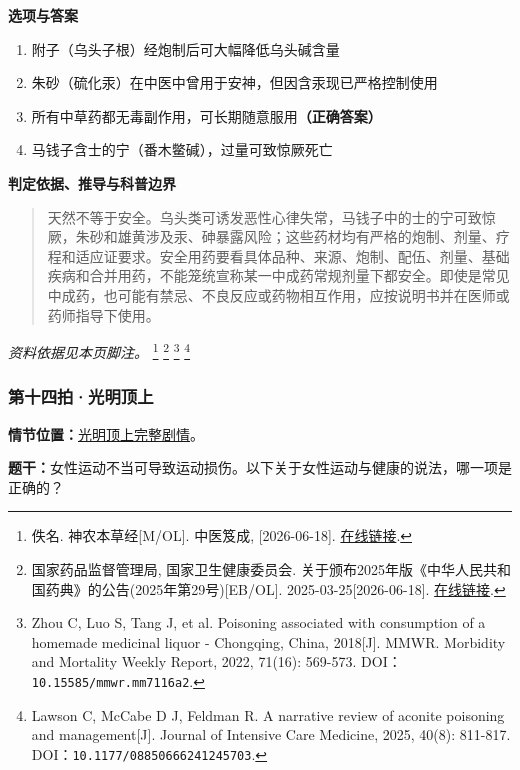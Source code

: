 \textbf{选项与答案}
\begin{enumerate}[label=\Alph*.,leftmargin=*]
  \item 附子（乌头子根）经炮制后可大幅降低乌头碱含量
  \item 朱砂（硫化汞）在中医中曾用于安神，但因含汞现已严格控制使用
  \item 所有中草药都无毒副作用，可长期随意服用\textbf{（正确答案）}
  \item 马钱子含士的宁（番木鳖碱），过量可致惊厥死亡
\end{enumerate}
\textbf{判定依据、推导与科普边界}
\begin{quote}天然不等于安全。乌头类可诱发恶性心律失常，马钱子中的士的宁可致惊厥，朱砂和雄黄涉及汞、砷暴露风险；这些药材均有严格的炮制、剂量、疗程和适应证要求。安全用药要看具体品种、来源、炮制、配伍、剂量、基础疾病和合并用药，不能笼统宣称某一中成药常规剂量下都安全。即使是常见中成药，也可能有禁忌、不良反应或药物相互作用，应按说明书并在医师或药师指导下使用。\end{quote}
\noindent\textit{资料依据见本页脚注。}
\footnote{佚名. 神农本草经[M/OL]. 中医笈成, [2026-06-18]. \href{https://jicheng.tw/tcm/book/神農本草經_2/index.html}{在线链接}.}
\footnote{国家药品监督管理局, 国家卫生健康委员会. 关于颁布2025年版《中华人民共和国药典》的公告(2025年第29号)[EB/OL]. 2025-03-25[2026-06-18]. \href{https://www.nmpa.gov.cn/xxgk/fgwj/gzwj/gzwjyp/20250325183810122.html}{在线链接}.}
\footnote{Zhou C, Luo S, Tang J, et al. Poisoning associated with consumption of a homemade medicinal liquor - Chongqing, China, 2018[J]. MMWR. Morbidity and Mortality Weekly Report, 2022, 71(16): 569-573. DOI：\nolinkurl{10.15585/mmwr.mm7116a2}.}
\footnote{Lawson C, McCabe D J, Feldman R. A narrative review of aconite poisoning and management[J]. Journal of Intensive Care Medicine, 2025, 40(8): 811-817. DOI：\nolinkurl{10.1177/08850666241245703}.}

\subsubsection{第十四拍·光明顶上}\label{question:zhaomin:14}
\textbf{情节位置：}\hyperref[plot:zhaomin:14]{光明顶上完整剧情}。

\textbf{题干：}女性运动不当可导致运动损伤。以下关于女性运动与健康的说法，哪一项是正确的？

